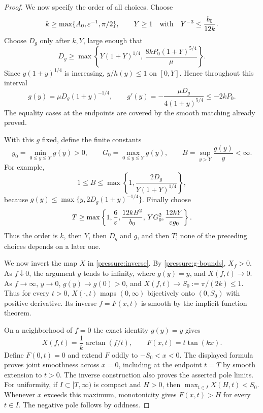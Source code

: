 \begin{proof}
We now specify the order of all choices.  Choose
\begin{equation}\label{pressure:k-Y}
 k\ge\max\{A_0,\varepsilon^{-1},\pi/2\},\qquad
 Y\ge1\quad\text{with}\quad Y^{-3}\le\frac{b_0}{12k}.
\end{equation}
Choose $D_g$ only after $k,Y$, large enough that
\begin{equation}\label{pressure:D-choice}
 D_g\ge\max\left\{
 Y(1+Y)^{1/4},\,
 \frac{8kP_0(1+Y)^{5/4}}{\mu}
 \right\}.
\end{equation}
Since $y(1+y)^{1/4}$ is increasing, $y/h(y)\le1$ on $[0,Y]$.
Hence throughout this interval
\begin{equation}\label{pressure:decreasing-range}
 g(y)=\mu D_g(1+y)^{-1/4},\qquad
 g'(y)=-\frac{\mu D_g}{4(1+y)^{5/4}}\le-2kP_0.
\end{equation}
The equality cases at the endpoints are covered by the smooth matching
already proved.

With this $g$ fixed, define the finite constants
\[
 g_0=\min_{0\le y\le Y}g(y)>0,\qquad
 G_0=\max_{0\le y\le Y}g(y),\qquad
 B=\sup_{y>Y}\frac{g(y)}y<\infty.
\]
For example,
\[
 1\le B\le\max\left\{1,\frac{2D_g}{Y(1+Y)^{1/4}}\right\},
\]
because $g(y)\le\max\{y,2D_g(1+y)^{-1/4}\}$.
Finally choose
\begin{equation}\label{pressure:T-choice}
 T\ge\max\left\{
 1,\frac6{\varepsilon},\frac{12kB^2}{b_0},\,
 YG_0^2,\frac{12kY}{\varepsilon g_0}
 \right\}.
\end{equation}
Thus the order is $k$, then $Y$, then $D_g$ and $g$, and then $T$;
none of the preceding choices depends on a later one.

We now invert the map $X$ in \cref{pressure:inverse}.
By \cref{pressure:g-bounds}, $X_f>0$.  As $f\downarrow0$, the argument
$y$ tends to infinity, where $g(y)=y$, and $X(f,t)\to0$.  As
$f\to\infty$, $y\to0$, $g(y)\to g(0)>0$, and
$X(f,t)\to S_0:=\pi/(2k)\le1$.  Thus for every $t>0$, $X(\cdot,t)$
maps $(0,\infty)$ bijectively onto $(0,S_0)$ with positive derivative.
Its inverse $f=F(x,t)$ is smooth by the implicit function theorem.

On a neighborhood of $f=0$ the exact identity $g(y)=y$ gives
\[
 X(f,t)=\frac1k\arctan(f/t),\qquad F(x,t)=t\tan(kx).
\]
Define $F(0,t)=0$ and extend $F$ oddly to $-S_0<x<0$.  The displayed
formula proves joint smoothness across $x=0$, including at the endpoint
$t=T$ by smooth extension to $t>0$.  The inverse construction also
proves the asserted pole limits.  For uniformity, if $I\subset[T,\infty)$
is compact and $H>0$, then $\max_{t\in I}X(H,t)<S_0$.  Whenever $x$
exceeds this maximum, monotonicity gives $F(x,t)>H$ for every $t\in I$.
The negative pole follows by oddness.


\end{proof}
